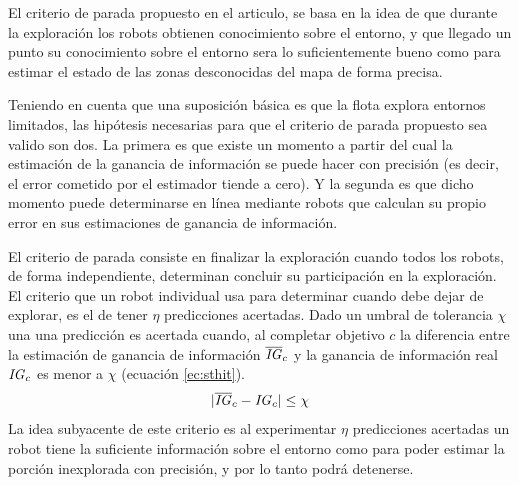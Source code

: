 El criterio de parada propuesto en el articulo, se basa en la idea de que durante la exploración los robots obtienen conocimiento sobre el entorno, y que llegado un punto su conocimiento sobre el entorno sera lo suficientemente bueno como para estimar el estado de las zonas desconocidas del mapa de forma precisa.

Teniendo en cuenta que una suposición básica es que la flota explora entornos limitados, las hipótesis necesarias para que el criterio de parada propuesto sea valido son dos. La primera es que existe un momento a partir del cual la estimación de la ganancia de información se puede hacer con precisión (es decir, el error cometido por el estimador tiende a cero). Y la segunda es que dicho momento puede determinarse en línea mediante robots que calculan su propio error en sus estimaciones de ganancia de información. 

El criterio de parada consiste en finalizar la exploración cuando todos los robots, de forma independiente, determinan concluir su participación en la exploración. El criterio que un robot individual usa para determinar cuando debe dejar de explorar, es el de tener $\eta$ predicciones acertadas. Dado un umbral de tolerancia $\chi$ una una predicción es acertada cuando, al completar objetivo $c$ la diferencia entre la estimación de ganancia de información $\overline{\mathit{IG}}_c$ y la ganancia de información real $\mathit{IG}_c$ es menor a $\chi$ (ecuación \ref{ec:sthit}). 
\begin{equation}\label{ec:sthit}
  |\overline{\mathit{IG}}_c - \mathit{IG}_c| \leq \chi
\end{equation}
La idea subyacente de este criterio es al experimentar $\eta$ predicciones acertadas un robot tiene la suficiente información sobre el entorno como para poder estimar la porción inexplorada con precisión, y por lo tanto podrá detenerse.

